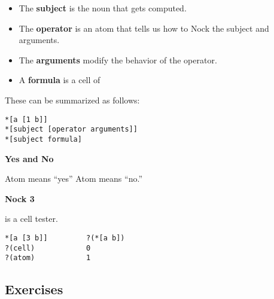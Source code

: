 \begin{itemize}
\item The \textbf{subject} is the noun that gets computed.
\item The \textbf{operator} is an atom that tells us how to Nock the subject and arguments.
\item The \textbf{arguments} modify the behavior of the operator.
\item A \textbf{formula} is a cell of 
\end{itemize}

These can be summarized as follows:

\begin{framed_shaded}
\begin{Verbatim}[fontsize=\relsize{-2.5},commandchars=\\\{\}]
*[a [1 b]]
*[subject [operator arguments]]
*[subject formula]
\end{Verbatim}
\end{framed_shaded}

\textbf{Yes and No}

Atom  means ``yes''
Atom  means ``no.''

\textbf{Nock 3}

 is a cell tester.
\begin{framed_shaded}
\begin{Verbatim}[fontsize=\relsize{-2.5},commandchars=\\\{\}]
*[a [3 b]]         ?(*[a b])
?(cell)            0
?(atom)            1
\end{Verbatim}
\end{framed_shaded}

\subsection{Exercises}

